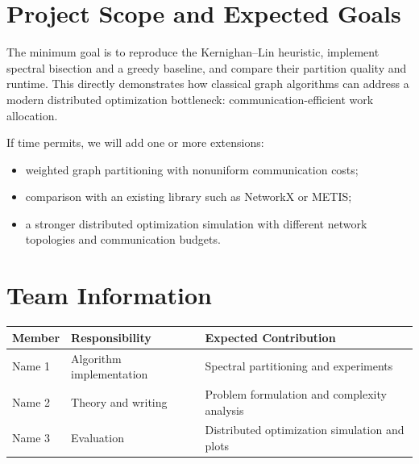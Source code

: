 \documentclass[10pt]{article}
\begin{document}
\section{Project Scope and Expected Goals}

The minimum goal is to reproduce the Kernighan--Lin heuristic, implement
spectral bisection and a greedy baseline, and compare their partition quality
and runtime. This directly demonstrates how classical graph algorithms can
address a modern distributed optimization bottleneck: communication-efficient
work allocation.

If time permits, we will add one or more extensions:
\begin{itemize}
    \item weighted graph partitioning with nonuniform communication costs;
    \item comparison with an existing library such as NetworkX or METIS;
    \item a stronger distributed optimization simulation with different
    network topologies and communication budgets.
\end{itemize}

\section{Team Information}

\begin{tabular}{@{}lll@{}}
\toprule
Member & Responsibility & Expected Contribution \\
\midrule
Name 1 & Algorithm implementation & Spectral partitioning and experiments \\
Name 2 & Theory and writing & Problem formulation and complexity analysis \\
Name 3 & Evaluation & Distributed optimization simulation and plots \\
\bottomrule
\end{tabular}
\end{document}
